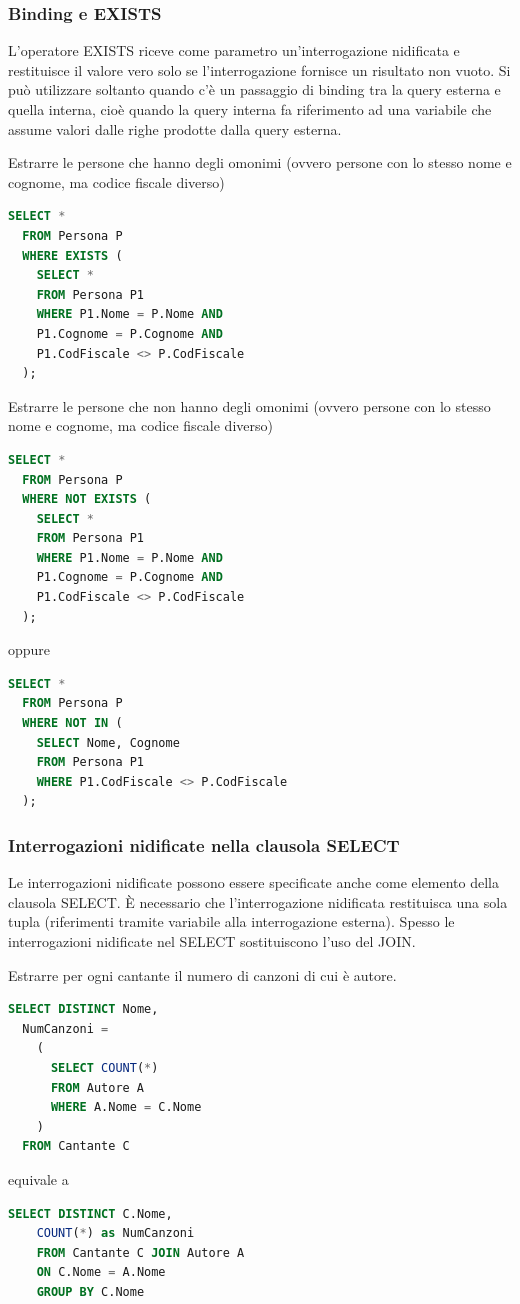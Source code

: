 \documentclass[a4paper,twoside]{article}
\begin{document}
\subsubsection{Binding e EXISTS}
L'operatore EXISTS riceve come parametro un'interrogazione nidificata e restituisce il
valore vero solo se l'interrogazione fornisce un risultato non vuoto. Si può utilizzare
soltanto quando c'è un passaggio di binding tra la query esterna e quella interna,
cioè quando la query interna fa riferimento ad una variabile che assume valori dalle
righe prodotte dalla query esterna.
\begin{example}
  Estrarre le persone che hanno degli omonimi (ovvero
  persone con lo stesso nome e cognome, ma codice fiscale
  diverso)
\begin{lstlisting}[language=SQL]
SELECT *
  FROM Persona P
  WHERE EXISTS (
    SELECT *
    FROM Persona P1
    WHERE P1.Nome = P.Nome AND
    P1.Cognome = P.Cognome AND
    P1.CodFiscale <> P.CodFiscale
  );
\end{lstlisting}
\end{example}
\begin{example}
  Estrarre le persone che non hanno degli omonimi (ovvero
  persone con lo stesso nome e cognome, ma codice fiscale
  diverso)
\begin{lstlisting}[language=SQL]
SELECT *
  FROM Persona P
  WHERE NOT EXISTS (
    SELECT *
    FROM Persona P1
    WHERE P1.Nome = P.Nome AND
    P1.Cognome = P.Cognome AND
    P1.CodFiscale <> P.CodFiscale
  );
\end{lstlisting}
  oppure
\begin{lstlisting}[language=SQL]
SELECT *
  FROM Persona P
  WHERE NOT IN (
    SELECT Nome, Cognome
    FROM Persona P1
    WHERE P1.CodFiscale <> P.CodFiscale
  );
\end{lstlisting}
\end{example}

\subsubsection{Interrogazioni nidificate nella clausola SELECT}
Le interrogazioni nidificate possono essere specificate anche come
elemento della clausola SELECT.
È necessario che l’interrogazione nidificata restituisca una
sola tupla (riferimenti tramite variabile alla interrogazione esterna).
Spesso le interrogazioni nidificate nel SELECT
sostituiscono l'uso del JOIN.
\begin{example}
  Estrarre per ogni cantante il numero di canzoni di cui è autore.
\begin{lstlisting}[language=SQL]
SELECT DISTINCT Nome,
  NumCanzoni =
    (
      SELECT COUNT(*)
      FROM Autore A
      WHERE A.Nome = C.Nome
    )
  FROM Cantante C
\end{lstlisting}
  equivale a 
\begin{lstlisting}[language=SQL]
  SELECT DISTINCT C.Nome,
    COUNT(*) as NumCanzoni
    FROM Cantante C JOIN Autore A
    ON C.Nome = A.Nome
    GROUP BY C.Nome
\end{lstlisting}
\end{example}
\end{document}
